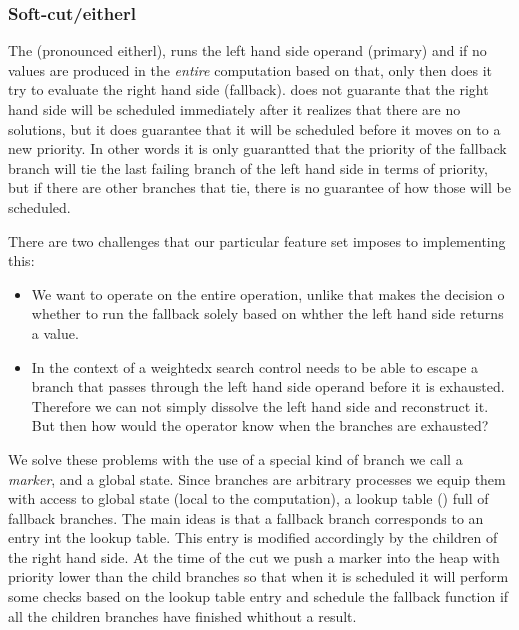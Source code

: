 \subsubsection{Soft-cut/eitherl}

The \hask{<//>} (pronounced eitherl),  runs the
left hand side operand (primary) and if no values are produced in the
\emph{entire} computation based on that, only then does it try to
evaluate the right hand side (fallback).  does not
guarante that the right hand side will be scheduled immediately after
it realizes that there are no solutions, but it does guarantee that it
will be scheduled before it moves on to a new priority. In other words
it is only guarantted that the priority of the fallback branch will
tie the last failing branch of the left hand side in terms of
priority, but if there are other branches that tie, there is no
guarantee of how those will be scheduled.

There are two challenges that our particular feature set imposes to
implementing this:

\begin{itemize}
\item We want \hask{<//>} to operate on the entire operation, unlike
  \cite{kiselyovBacktrackingInterleavingTerminating} that makes the
  decision o whether to run the fallback solely based on whther the
  left hand side returns a value.
\item In the context of a weightedx search control needs to be able to
  escape a branch that passes through the left hand side operand
  before it is exhausted. Therefore we can not simply dissolve the
  left hand side and reconstruct it. But then how would the operator
  know when the branches are exhausted?
\end{itemize}

We solve these problems with the use of a special kind of branch we
call a \emph{marker}, and a global state. Since branches are arbitrary
processes we equip them with access to global state (local to the
computation), a lookup table () full of fallback
branches. The main ideas is that a fallback branch corresponds to an
entry int the lookup table. This entry is modified accordingly by the
children of the right hand side. At the time of the cut we push a
marker into the heap with priority lower than the child branches so
that when it is scheduled it will perform some checks based on the
lookup table entry and schedule the fallback function if all the
children branches have finished whithout a result.

